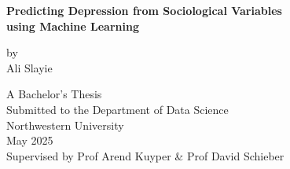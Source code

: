 \begin{titlepage}
\centering
\vspace*{2cm}

\Large\textbf{Predicting Depression from Sociological Variables}\\[0.5cm]
\Large\textbf{using Machine Learning}

\vspace{2cm}

\normalsize
by\\[0.3cm]
Ali Slayie

\vfill

A Bachelor’s Thesis\\
Submitted to the Department of Data Science\\
Northwestern University\\
May 2025\\
Supervised by Prof Arend Kuyper \& Prof David Schieber

\end{titlepage}
\newpage
